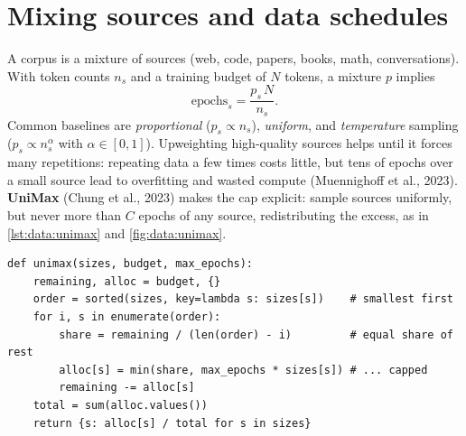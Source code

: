 \section{Mixing sources and data schedules}\label{sec:data:mixing}

A corpus is a mixture of sources (web, code, papers, books, math, conversations). With token
counts $n_s$ and a training budget of $N$ tokens, a mixture $p$ implies
\[
\text{epochs}_s = \frac{p_s\,N}{n_s}.
\]
Common baselines are \emph{proportional} ($p_s\propto n_s$), \emph{uniform}, and
\emph{temperature} sampling ($p_s\propto n_s^{\alpha}$ with $\alpha\in[0,1]$). Upweighting
high-quality sources helps until it forces many repetitions: repeating data a few times costs
little, but tens of epochs over a small source lead to overfitting and wasted compute
(Muennighoff et al., 2023). \textbf{UniMax} (Chung et al., 2023) makes the cap explicit: sample
sources uniformly, but never more than $C$ epochs of any source, redistributing the excess, as in
\cref{lst:data:unimax} and \cref{fig:data:unimax}.

\begin{lstlisting}[caption={UniMax as water-filling (from \code{llmsys/datapipe/mixing.py}).},label={lst:data:unimax}]
def unimax(sizes, budget, max_epochs):
    remaining, alloc = budget, {}
    order = sorted(sizes, key=lambda s: sizes[s])    # smallest first
    for i, s in enumerate(order):
        share = remaining / (len(order) - i)         # equal share of rest
        alloc[s] = min(share, max_epochs * sizes[s]) # ... capped
        remaining -= alloc[s]
    total = sum(alloc.values())
    return {s: alloc[s] / total for s in sizes}
\end{lstlisting}

